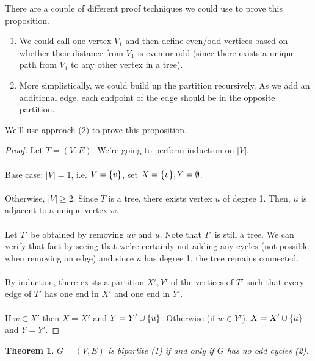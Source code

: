 \documentclass[]{article}
\newtheorem*{theorem}{Theorem}
\theoremstyle{definition}
\DeclarePairedDelimiter{\set}{\lbrace}{\rbrace}
\begin{document}
			There are a couple of different proof techniques we could use to prove this proposition.
			\begin{enumerate}
				\item We could call one vertex $V_1$ and then define even/odd vertices based on whether their distance from $V_1$ is even or odd (since there exists a unique path from $V_1$ to any other vertex in a tree).
				\item More simplistically, we could build up the partition recursively. As we add an additional edge, each endpoint of the edge should be in the opposite partition.
			\end{enumerate}

			We'll use approach (2) to prove this proposition.
			\begin{proof}
				Let $T = (V, E)$. We're going to perform induction on $|V|$.
				\\ \\
				Base case: $|V| = 1$, i.e. $V = \set{v}$, set $X = \set{v}, Y = \emptyset$.
				\\ \\
				Otherwise, $|V| \ge 2$. Since $T$ is a tree, there exists vertex $u$ of degree 1. Then, $u$ is adjacent to a unique vertex $w$.
				\\ \\
				Let $T'$ be obtained by removing $uv$ and $u$. Note that $T'$ is still a tree. We can verify that fact by seeing that we're certainly not adding any cycles (not possible when removing an edge) and since $u$ has degree 1, the tree remains connected.
				\\ \\
				By induction, there exists a partition $X', Y'$ of the vertices of $T'$ such that every edge of $T'$ has one end in $X'$ and one end in $Y'$.
				\\ \\
				If $w \in X'$ then $X = X'$ and $Y = Y' \cup \set{u}$. Otherwise (if $w \in Y'$), $X = X' \cup \set{u}$ and $Y = Y'$.
			\end{proof}

			\begin{theorem}
				$G = (V, E)$ is bipartite (1) if and only if $G$ has no odd cycles (2).
			\end{theorem}
\end{document}
